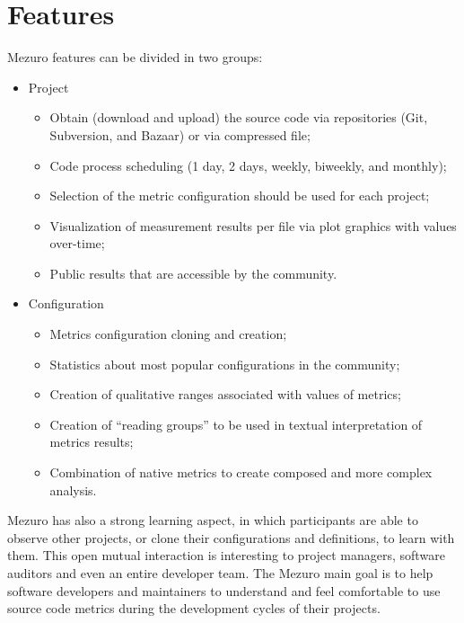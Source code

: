 \section{Features}
\label{sec:features}

Mezuro features can be divided in two groups:

\begin{itemize}
    \item Project

    \begin{itemize}
        \item Obtain (download and upload) the source code via repositories (Git, Subversion, and Bazaar) or via compressed file;
        \item Code process scheduling (1 day, 2 days, weekly, biweekly, and monthly);
        \item Selection of the metric configuration should be used for each project;
        \item Visualization of measurement results per file via plot graphics with values over-time;
        \item Public results that are accessible by the community.
    \end{itemize}
    \item Configuration
    \begin{itemize}
        \item Metrics configuration cloning and creation;
        \item Statistics about most popular configurations in the community;
        \item Creation of qualitative ranges associated with values of metrics;
      	\item Creation of ``reading groups'' to be used in textual interpretation of metrics results;
        \item Combination of native metrics to create composed and more complex analysis.
    \end{itemize}
\end{itemize}

Mezuro has also a strong learning aspect, in which participants are able to
observe other projects, or clone their configurations and definitions, to learn
with them.  This open mutual interaction is interesting to project managers,
software auditors and even an entire developer team. The Mezuro main goal is to
help software developers and maintainers to understand and feel comfortable to
use source code metrics during the development cycles of their projects.

